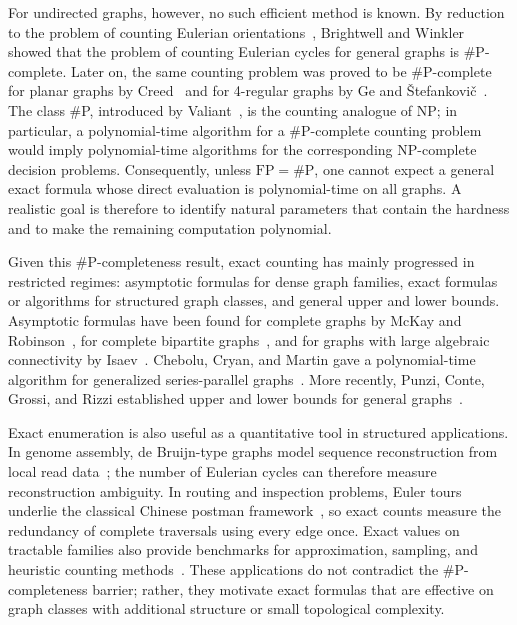 \documentclass[11pt]{amsart}
\theoremstyle{plain}
\theoremstyle{definition}
\numberwithin{equation}{section}
\begin{document}
For undirected graphs, however, no such efficient method is known. By reduction to the problem of counting Eulerian orientations~\cite{MW1996on}, Brightwell and Winkler~\cite{BW2005counting} showed that the problem of counting Eulerian cycles for general graphs is \#P-complete. Later on, the same counting problem was proved to be \#P-complete for planar graphs by Creed~\cite{C2010counting} and for 4-regular graphs by Ge and {\v{S}}tefankovi{\v{c}}~\cite{GS2012the}.  The class \#P, introduced by Valiant~\cite{V1979complexity}, is the counting analogue of NP; in particular, a polynomial-time algorithm for a \#P-complete counting problem would imply polynomial-time algorithms for the corresponding NP-complete decision problems.  Consequently, unless $\mathrm{FP}=\#\mathrm{P}$, one cannot expect a general exact formula whose direct evaluation is polynomial-time on all graphs.  A realistic goal is therefore to identify natural parameters that contain the hardness and to make the remaining computation polynomial.

Given this \#P-completeness result, exact counting has mainly progressed in restricted regimes: asymptotic formulas for dense graph families, exact formulas or algorithms for structured graph classes, and general upper and lower bounds.  Asymptotic formulas have been found for complete graphs by McKay and Robinson~\cite{MR1998asymptotic}, for complete bipartite graphs~\cite{I2009asymptotic}, and for graphs with large algebraic connectivity by Isaev~\cite{I2011asymptotic}.  Chebolu, Cryan, and Martin gave a polynomial-time algorithm for generalized series-parallel graphs~\cite{CCM2012Exact}.  More recently, Punzi, Conte, Grossi, and Rizzi established upper and lower bounds for general graphs~\cite{P2023bounding, PCGR2024refined}.

Exact enumeration is also useful as a quantitative tool in structured applications.  In genome assembly, de Bruijn-type graphs model sequence reconstruction from local read data~\cite{PTW2001eulerian,CPT2011debruijn}; the number of Eulerian cycles can therefore measure reconstruction ambiguity.  In routing and inspection problems, Euler tours underlie the classical Chinese postman framework~\cite{EJ1973matching}, so exact counts measure the redundancy of complete traversals using every edge once.  Exact values on tractable families also provide benchmarks for approximation, sampling, and heuristic counting methods~\cite{C2010counting}.  These applications do not contradict the \#P-completeness barrier; rather, they motivate exact formulas that are effective on graph classes with additional structure or small topological complexity.
\end{document}
